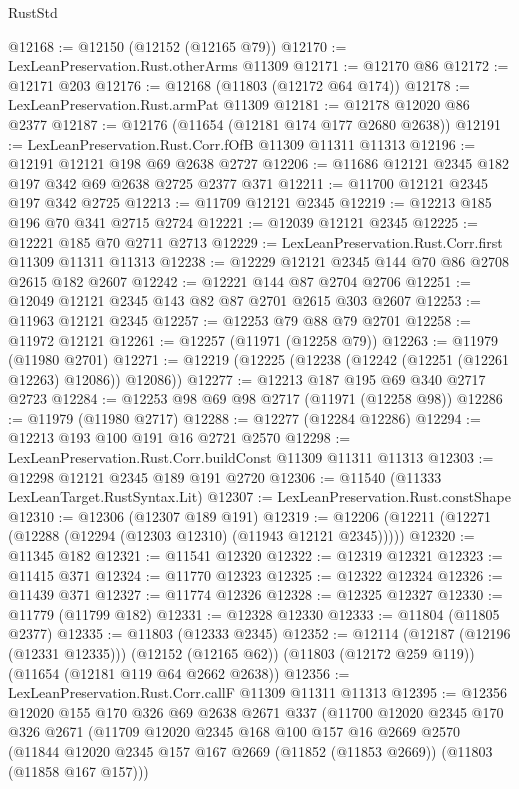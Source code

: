 \begin{lexlean}{RustStd}
\begin{coremodule}
@12168 := @12150 (@12152 (@12165 @79))
@12170 := LexLeanPreservation.Rust.otherArms @11309
@12171 := @12170 @86
@12172 := @12171 @203
@12176 := @12168 (@11803 (@12172 @64 @174))
@12178 := LexLeanPreservation.Rust.armPat @11309
@12181 := @12178 @12020 @86 @2377
@12187 := @12176 (@11654 (@12181 @174 @177 @2680 @2638))
@12191 := LexLeanPreservation.Rust.Corr.fOfB @11309 @11311 @11313
@12196 := @12191 @12121 @198 @69 @2638 @2727
@12206 := @11686 @12121 @2345 @182 @197 @342 @69 @2638 @2725 @2377 @371
@12211 := @11700 @12121 @2345 @197 @342 @2725
@12213 := @11709 @12121 @2345
@12219 := @12213 @185 @196 @70 @341 @2715 @2724
@12221 := @12039 @12121 @2345
@12225 := @12221 @185 @70 @2711 @2713
@12229 := LexLeanPreservation.Rust.Corr.first @11309 @11311 @11313
@12238 := @12229 @12121 @2345 @144 @70 @86 @2708 @2615 @182 @2607
@12242 := @12221 @144 @87 @2704 @2706
@12251 := @12049 @12121 @2345 @143 @82 @87 @2701 @2615 @303 @2607
@12253 := @11963 @12121 @2345
@12257 := @12253 @79 @88 @79 @2701
@12258 := @11972 @12121
@12261 := @12257 (@11971 (@12258 @79))
@12263 := @11979 (@11980 @2701)
@12271 := @12219 (@12225 (@12238 (@12242 (@12251 (@12261 @12263) @12086)) @12086))
@12277 := @12213 @187 @195 @69 @340 @2717 @2723
@12284 := @12253 @98 @69 @98 @2717 (@11971 (@12258 @98))
@12286 := @11979 (@11980 @2717)
@12288 := @12277 (@12284 @12286)
@12294 := @12213 @193 @100 @191 @16 @2721 @2570
@12298 := LexLeanPreservation.Rust.Corr.buildConst @11309 @11311 @11313
@12303 := @12298 @12121 @2345 @189 @191 @2720
@12306 := @11540 (@11333 LexLeanTarget.RustSyntax.Lit)
@12307 := LexLeanPreservation.Rust.constShape
@12310 := @12306 (@12307 @189 @191)
@12319 := @12206 (@12211 (@12271 (@12288 (@12294 (@12303 @12310) (@11943 @12121 @2345)))))
@12320 := @11345 @182
@12321 := @11541 @12320
@12322 := @12319 @12321
@12323 := @11415 @371
@12324 := @11770 @12323
@12325 := @12322 @12324
@12326 := @11439 @371
@12327 := @11774 @12326
@12328 := @12325 @12327
@12330 := @11779 (@11799 @182)
@12331 := @12328 @12330
@12333 := @11804 (@11805 @2377)
@12335 := @11803 (@12333 @2345)
@12352 := @12114
    (@12187 (@12196 (@12331 @12335)))
    (@12152 (@12165 @62))
    (@11803 (@12172 @259 @119))
    (@11654 (@12181 @119 @64 @2662 @2638))
@12356 := LexLeanPreservation.Rust.Corr.callF @11309 @11311 @11313
@12395 := @12356
    @12020
    @155
    @170
    @326
    @69
    @2638
    @2671
    @337
    (@11700
      @12020
      @2345
      @170
      @326
      @2671
      (@11709
        @12020
        @2345
        @168
        @100
        @157
        @16
        @2669
        @2570
        (@11844 @12020 @2345 @157 @167 @2669 (@11852 (@11853 @2669)) (@11803 (@11858 @167 @157)))

\end{coremodule}
\end{lexlean}
